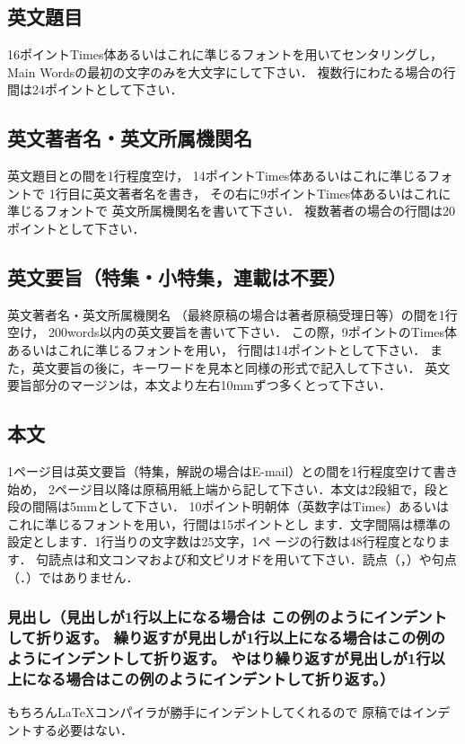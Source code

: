 \documentclass[main]{subfiles}
\begin{document}
    \subsection{英文題目}
    
        16ポイントTimes体あるいはこれに準じるフォントを用いてセンタリングし，
        Main Wordsの最初の文字のみを大文字にして下さい．
        複数行にわたる場合の行間は24ポイントとして下さい．
    
    \subsection{英文著者名・英文所属機関名}
    
        英文題目との間を1行程度空け，
        14ポイントTimes体あるいはこれに準じるフォントで
        1行目に英文著者名を書き，
        その右に9ポイントTimes体あるいはこれに準じるフォントで
        英文所属機関名を書いて下さい．
        複数著者の場合の行間は20ポイントとして下さい．
    
    \subsection{英文要旨（特集・小特集，連載は不要）}
    
        英文著者名・英文所属機関名
        （最終原稿の場合は著者原稿受理日等）の間を1行空け，
        200words以内の英文要旨を書いて下さい．
        この際，9ポイントのTimes体あるいはこれに準じるフォントを用い，
        行間は14ポイントとして下さい．
        また，英文要旨の後に，キーワードを見本と同様の形式で記入して下さい．
        英文要旨部分のマージンは，本文より左右10mmずつ多くとって下さい．
    
    \subsection{本文}
    
        1ページ目は英文要旨（特集，解説の場合はE-mail）との間を1行程度空けて書き始め，
        2ページ目以降は原稿用紙上端から記して下さい．本文は2段組で，段と段の間隔は5mmとして下さい．
        10ポイント明朝体（英数字はTimes）あるいはこれに準じるフォントを用い，行間は15ポイントとし
        ます．文字間隔は標準の設定とします．1行当りの文字数は25文字，1ペ
        ージの行数は48行程度となります．
        句読点は和文コンマおよび和文ピリオドを用いて下さい．読点（，）や句点（．）ではありません．
    
        \subsubsection{見出し（見出しが1行以上になる場合は%
                この例のようにインデントして折り返す。
                繰り返すが見出しが1行以上になる場合はこの例のようにインデントして折り返す。
                やはり繰り返すが見出しが1行以上になる場合はこの例のようにインデントして折り返す。）}
            もちろんLaTeXコンパイラが勝手にインデントしてくれるので
            原稿ではインデントする必要はない．
    
\end{document}
